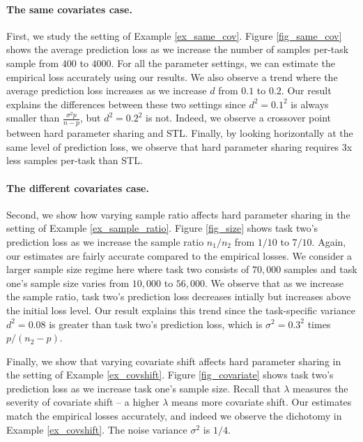 \paragraph{The same covariates case.}
First, we study the setting of Example \ref{ex_same_cov}.
Figure \ref{fig_same_cov} shows the average prediction loss as we increase the number of samples per-task sample from $400$ to $4000$.
For all the parameter settings, we can estimate the empirical loss accurately using our results.
We also observe a trend where the average prediction loss increases as we increase $d$ from $0.1$ to $0.2$.
Our result explains the differences between these two settings since $d^2 = 0.1^2$ is always smaller than $\frac{\sigma^2 p}{n - p}$, but $d^2 = 0.2^2$ is not.
Indeed, we observe a crossover point between hard parameter sharing and STL.
Finally, by looking horizontally at the same level of prediction loss, we observe that hard parameter sharing requires 3x less samples per-task than STL.

\paragraph{The different covariates case.}
Second, we show how varying sample ratio affects hard parameter sharing in the setting of Example \ref{ex_sample_ratio}.
Figure \ref{fig_size} shows task two's prediction loss as we increase the sample ratio $n_1 / n_2$ from $1/10$ to $7/10$.
Again, our estimates are fairly accurate compared to the empirical losses.
We consider a larger sample size regime here where task two consists of $70,000$ samples and task one's sample size varies from $10,000$ to $56,000$.
We observe that as we increase the sample ratio, task two's prediction loss decreases intially but increases above the initial loss level.
Our result explains this trend since the task-specific variance $d^2 = 0.08$ is greater than task two's prediction loss, which is $\sigma^2 = 0.3^2$ times $p / (n_2 - p)$.

Finally, we show that varying covariate shift affects hard parameter sharing in the setting of Example \ref{ex_covshift}.
Figure \ref{fig_covariate} shows task two's prediction loss as we increase task one's sample size.
Recall that $\lambda$ measures the severity of covariate shift -- a higher $\lambda$ means more covariate shift.
Our estimates match the empirical losses accurately, and indeed we observe the dichotomy in Example \ref{ex_covshift}.
The noise variance $\sigma^2$ is $1/4$.


